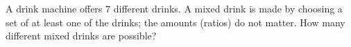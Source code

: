 A drink machine offers \(7\) different drinks. A mixed drink is made by choosing a set of at least one of the drinks; the amounts (ratios) do not matter. How many different mixed drinks are possible?
